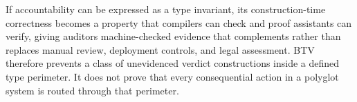 If accountability can be expressed as a type invariant,
its construction-time correctness becomes a property that compilers
can check and proof assistants can verify, giving auditors
machine-checked evidence that complements rather than replaces manual
review, deployment controls, and legal assessment.
BTV therefore prevents a class of unevidenced verdict constructions
inside a defined type perimeter.  It does not prove that every
consequential action in a polyglot system is routed through that perimeter.
